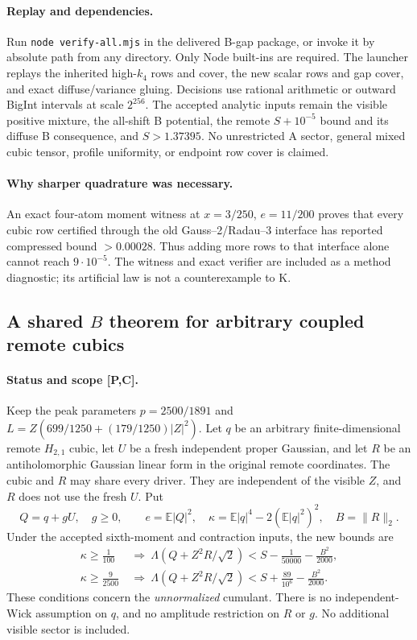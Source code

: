 \paragraph{Replay and dependencies.}
Run \texttt{node verify-all.mjs} in the delivered B-gap package,
or invoke it by absolute path from any directory. Only Node built-ins
are required. The launcher replays the inherited high-$k_4$ rows and
cover, the new scalar rows and gap cover, and exact diffuse/variance
gluing. Decisions use rational arithmetic or outward BigInt intervals
at scale $2^{256}$. The accepted analytic inputs remain the visible
positive mixture, the all-shift B potential, the remote
$S+10^{-5}$ bound and its diffuse B consequence, and $S>1.37395$.
No unrestricted A sector, general mixed cubic tensor, profile
uniformity, or endpoint row cover is claimed.

\paragraph{Why sharper quadrature was necessary.}
An exact four-atom moment witness at $x=3/250$, $e=11/200$ proves
that every cubic row certified through the old Gauss--2/Radau--3
interface has reported compressed bound $>0.00028$.
Thus adding more rows to that interface alone cannot reach
$9\cdot10^{-5}$. The witness and exact verifier are included as a
method diagnostic; its artificial law is not a counterexample to K.

\subsection{A shared \(B\) theorem for arbitrary coupled remote cubics}
\label{sec:general-coupled-B-cumulant}

\paragraph{Status and scope [P,C].}
Keep the peak parameters \(p=2500/1891\) and
\(L=Z(699/1250+(179/1250)|Z|^2)\).
Let \(q\) be an arbitrary finite-dimensional remote \(H_{2,1}\) cubic,
let \(U\) be a fresh independent proper Gaussian, and let \(R\) be an
antiholomorphic Gaussian linear form in the original remote coordinates.
The cubic and \(R\) may share every driver. They are independent of
the visible \(Z\), and \(R\) does not use the fresh \(U\).
Put
\[
 Q=q+gU,\quad g\ge0,\qquad e=\mathbb E|Q|^2,\quad
 \kappa=\mathbb E|q|^4-2(\mathbb E|q|^2)^2,\quad B=\|R\|_2.
\]
Under the accepted sixth-moment and contraction inputs, the new bounds are
\begin{align}
 \kappa\ge\frac1{100}
 &\ \Longrightarrow\
 \Lambda(Q+Z^2R/\sqrt2)
 <S-\frac1{50000}-\frac{B^2}{2000},                 \label{eq:general-B-strict}\\
 \kappa\ge\frac9{2500}
 &\ \Longrightarrow\
 \Lambda(Q+Z^2R/\sqrt2)
 <S+\frac{89}{10^6}-\frac{B^2}{2000}.               \label{eq:general-B-weak}
\end{align}
These conditions concern the \emph{unnormalized} cumulant.
There is no independent-Wick assumption on \(q\), and no amplitude
restriction on \(R\) or \(g\). No additional visible sector is included.

